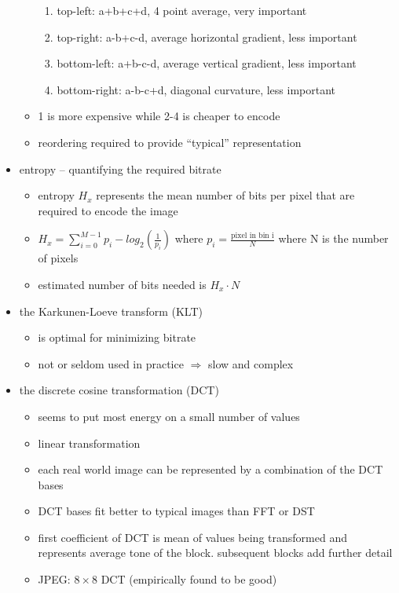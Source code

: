\documentclass[a4paper,10pt]{scrreprt}
\begin{document}
\begin{itemize}
\begin{itemize}
 \begin{enumerate}
  \item top-left: a+b+c+d, 4 point average, very important
  \item top-right: a-b+c-d, average horizontal gradient, less important
  \item bottom-left: a+b-c-d, average vertical gradient, less important
  \item bottom-right: a-b-c+d, diagonal curvature, less important
 \end{enumerate}
 \item 1 is more expensive while 2-4 is cheaper to encode 
 \item reordering required to provide ``typical'' representation
\end{itemize}
 \item entropy -- quantifying the required bitrate
 \begin{itemize}
  \item entropy $H_x$ represents the mean number of bits per pixel that are required to encode the image 
  \item $H_x = \sum\limits_{i=0}^{M-1} p_i-log_2\left(\frac{1}{p_i}\right)$ where $p_i = \frac{\text{pixel in bin i}}{N}$ where N is the number of pixels
  \item estimated number of bits needed is $H_x\cdot N$
 \end{itemize}
 \item the Karkunen-Loeve transform (KLT)
 \begin{itemize}
  \item is optimal for minimizing bitrate
  \item not or seldom used in practice $\Rightarrow$ slow and complex
 \end{itemize}
 \item the discrete cosine transformation (DCT)
 \begin{itemize}
  \item seems to put most energy on a small number of values
  \item linear transformation
  \item each real world image can be represented by a combination of the DCT bases
  \item DCT bases fit better to typical images than FFT or DST
  \item first coefficient of DCT is mean of values being transformed and represents average tone of the block. subsequent blocks add further detail
  \item JPEG: $8\times 8$ DCT (empirically found to be good)

\end{itemize}
\end{itemize}
\end{document}
